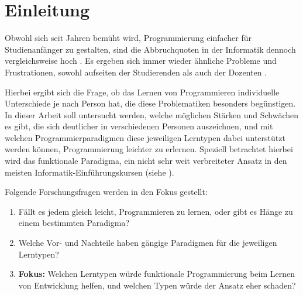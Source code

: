 \clearpage
\section{Einleitung}
\label{sec:intro}

Obwohl sich seit Jahren bemüht wird, Programmierung einfacher für Studienanfänger zu gestalten, sind die Abbruchquoten in der Informatik dennoch vergleichsweise hoch \cite{dhzw}. 
Es ergeben sich immer wieder ähnliche Probleme und Frustrationen, sowohl aufseiten der Studierenden als auch der Dozenten \cite{mcdonald}.

Hierbei ergibt sich die Frage, ob das Lernen von Programmieren individuelle Unterschiede je nach Person hat, die diese Problematiken besonders begünstigen. In dieser Arbeit soll untersucht werden, welche möglichen Stärken und Schwächen es gibt, die sich deutlicher in verschiedenen Personen auszeichnen, und mit welchen Programmierparadigmen diese jeweiligen Lerntypen dabei unterstützt werden können, Programmierung leichter zu erlernen.
Speziell betrachtet hierbei wird das funktionale Paradigma, ein nicht sehr weit verbreiteter Ansatz in den meisten Informatik-Einführungskursen (siehe ).

Folgende Forschungsfragen werden in den Fokus gestellt:

\begin{enumerate}
    \item Fällt es jedem gleich leicht, Programmieren zu lernen, oder gibt es Hänge zu einem bestimmten Paradigma?
    \item Welche Vor- und Nachteile haben gängige Paradigmen für die jeweiligen Lerntypen?
    \item \textbf{Fokus:} Welchen Lerntypen würde funktionale Programmierung beim Lernen von Entwicklung helfen, und welchen Typen würde der Ansatz eher schaden?
\end{enumerate}
